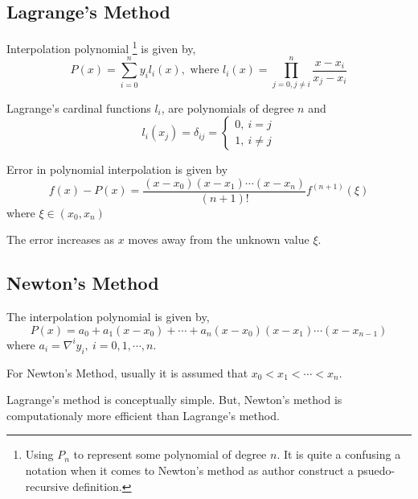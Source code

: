\subsection{Lagrange's Method}
Interpolation polynomial
\footnote{
	Using $P_n$ to represent some polynomial of degree $n$.
	It is quite a confusing a notation when it comes to Newton's method as author construct a psuedo-recursive definition.
	}
	is given by,
\begin{equation}
	P(x) = \sum_{i=0}^n y_i l_i(x),\text{ where } l_i(x) = \prod_{j = 0,j \ne i}^n \frac{x-x_i}{x_j-x_i}
	\label{equ:lagrange}
\end{equation}
\begin{remark}
	Lagrange's cardinal functions $l_i$, are polynomials of degree $n$ and
	\[l_i(x_j) = \delta_{ij} = \begin{cases} 0,\ i = j \\ 1,\ i \ne j \end{cases}\]
\end{remark}
\begin{proposition}
	Error in polynomial interpolation is given by
	\begin{equation}
		f(x) - P(x) = \frac{(x-x_0)(x-x_1)\cdots(x-x_n)}{(n+1)!} f^{(n+1)}(\xi)
		\label{equ:error}
	\end{equation}
	where $\xi \in (x_0, x_n)$
\end{proposition}
\begin{remark}
	The error increases as $x$ moves away from the unknown value $\xi$.
\end{remark}

\subsection{Newton's Method}
The interpolation polynomial is given by,
\begin{equation}
	P(x) = a_0 + a_1(x-x_0) + \cdots + a_n(x-x_0)(x-x_1)\cdots(x-x_{n-1})
	\label{equ:newton}
\end{equation}
where $a_i = \nabla^i y_i,\ i = 0,1,\cdots,n$.
\begin{remark}
	For Newton's Method, usually it is assumed that $x_0 < x_1 < \cdots < x_n$.
\end{remark}
\begin{remark}
	 Lagrange's method is conceptually simple.
	 But, Newton's method is computationaly more efficient than Lagrange's method.
\end{remark}
